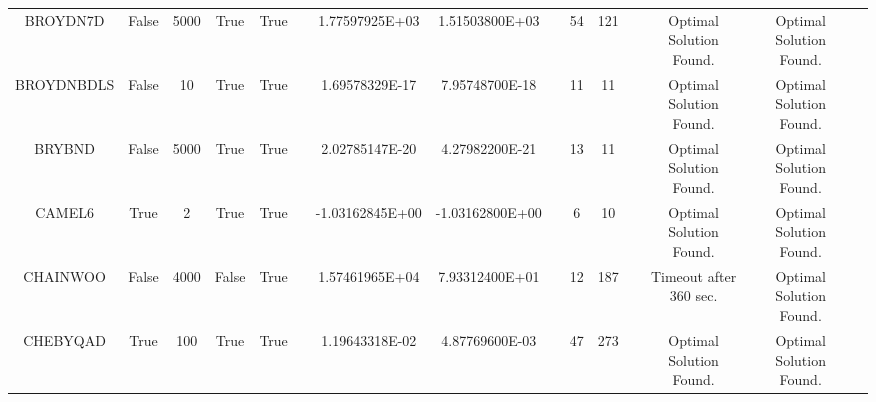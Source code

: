 \begin{longtable}{ccccccccccccccc}
	\cellcolor{default2} BROYDN7D& \cellcolor{default2} False& \cellcolor{default2} 5000& \cellcolor{default2} True& \cellcolor{default2} True& \cellcolor{header} & \cellcolor{poor} 1.77597925E+03& \cellcolor{best} 1.51503800E+03& \cellcolor{header} & \cellcolor{best} 54& \cellcolor{poor} 121& \cellcolor{header} & \cellcolor{default2} Optimal Solution Found.& \cellcolor{default2} Optimal Solution Found.& \cellcolor{header} \\
	\cellcolor{default1} BROYDNBDLS& \cellcolor{default1} False& \cellcolor{default1} 10& \cellcolor{default1} True& \cellcolor{default1} True& \cellcolor{header} & \cellcolor{ok} 1.69578329E-17& \cellcolor{best} 7.95748700E-18& \cellcolor{header} & \cellcolor{best} 11& \cellcolor{best} 11& \cellcolor{header} & \cellcolor{default1} Optimal Solution Found.& \cellcolor{default1} Optimal Solution Found.& \cellcolor{header} \\
	\cellcolor{default2} BRYBND& \cellcolor{default2} False& \cellcolor{default2} 5000& \cellcolor{default2} True& \cellcolor{default2} True& \cellcolor{header} & \cellcolor{ok} 2.02785147E-20& \cellcolor{best} 4.27982200E-21& \cellcolor{header} & \cellcolor{ok} 13& \cellcolor{best} 11& \cellcolor{header} & \cellcolor{default2} Optimal Solution Found.& \cellcolor{default2} Optimal Solution Found.& \cellcolor{header} \\
	\cellcolor{default1} CAMEL6& \cellcolor{default1} True& \cellcolor{default1} 2& \cellcolor{default1} True& \cellcolor{default1} True& \cellcolor{header} & \cellcolor{best} -1.03162845E+00& \cellcolor{ok} -1.03162800E+00& \cellcolor{header} & \cellcolor{best} 6& \cellcolor{ok} 10& \cellcolor{header} & \cellcolor{default1} Optimal Solution Found.& \cellcolor{default1} Optimal Solution Found.& \cellcolor{header} \\
	\cellcolor{default2} CHAINWOO& \cellcolor{default2} False& \cellcolor{default2} 4000& \cellcolor{default2} False& \cellcolor{default2} True& \cellcolor{header} & \cellcolor{poor} 1.57461965E+04& \cellcolor{best} 7.93312400E+01& \cellcolor{header} & \cellcolor{best} 12& \cellcolor{poor} 187& \cellcolor{header} & \cellcolor{default2} Timeout after 360 sec.& \cellcolor{default2} Optimal Solution Found.& \cellcolor{header} \\
	\cellcolor{default1} CHEBYQAD& \cellcolor{default1} True& \cellcolor{default1} 100& \cellcolor{default1} True& \cellcolor{default1} True& \cellcolor{header} & \cellcolor{poor} 1.19643318E-02& \cellcolor{best} 4.87769600E-03& \cellcolor{header} & \cellcolor{best} 47& \cellcolor{poor} 273& \cellcolor{header} & \cellcolor{default1} Optimal Solution Found.& \cellcolor{default1} Optimal Solution Found.& \cellcolor{header} \\

\end{longtable}

